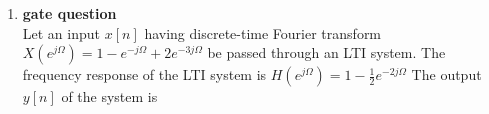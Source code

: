 \documentclass{article}
\begin{document}
\begin{enumerate}
\item \textbf{gate question}\\

Let an input \( x[n] \) having discrete-time Fourier transform
$X(e^{j\Omega}) = 1 - e^{-j\Omega} + 2e^{-3j\Omega}$
be passed through an LTI system. The frequency response of the LTI system is 
$H(e^{j\Omega}) = 1 - \frac{1}{2} e^{-2j\Omega}$
The output $y[n]$ of the system is \\


\end{enumerate}
\end{document}
